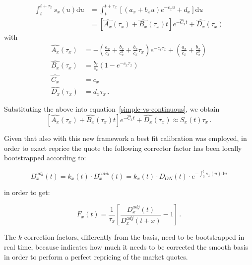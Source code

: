 \begin{equation}
\begin{split}
\int_t^{t+\tau_x} s_x(u) \mathrm{d}u &= \int_t^{t+\tau_x} \left[ (a_x + b_x u)e^{-c_x u} + d_x \right] \mathrm{d}u \\
                                     &= \left[\hat{A_x}(\tau_x) + \hat{B_x}(\tau_x) t\right] e^{-\hat{C}_x  t} + \hat{D_x}(\tau_x)
\end{split}
\end{equation}
with
\begin{equation}
\label{eq:integratedCoef}
\begin{split}
\hat{A_x}(\tau_x)&=-\left(\frac{a_x}{c_x}+ \frac{b_x}{c_x^{2}}+\frac{b_x}{c_x}\tau_x \right)e^{-c_x \tau_x}+\left(\frac{a_x}{c_x}+ \frac{b_x}{c_x^{2}}\right) \\
\hat{B_x}(\tau_x)&=\frac{b_x}{c_x}\left(1-e^{-c_x \tau_x}\right) \\
\hat{C_x}&=c_x \\
\hat{D_x}(\tau_x)&=d_x \tau_x\,.
\end{split}
\end{equation}

Substituting the above into equation~\ref{simple-vs-continuous}, we obtain
\begin{equation}
\left[\hat{A_x}(\tau_x) + \hat{B_x}(\tau_x) t\right] e^{-\hat{C}_x t} + \hat{D_x}(\tau_x) \approx S_x(t) \tau_x \,.
\end{equation}

Given that also with this new framework a best fit calibration was employed, in order to exact reprice the quote the following corrector factor has been locally bootstrapped according to:

\begin{equation}
\label{eq:bootstrapp_correcton_factors}
D_x^{adj}(t) = k_x(t) \cdot D_x^{calib}(t) = k_x(t) \cdot D_{ON}(t) \cdot e^{-\int_0^{t} s_x(u) \mathrm{d}u}
\end{equation}

in order to get:

\begin{equation}
F_x(t) = \frac{1}{\tau_x} \left[\frac{D^{adj}_x(t)}{D^{adj}_x(t+x)} - 1 \right]\,.
\end{equation}

The $k$ correction factors, differently from the basis, need to be bootstrapped in real time, because indicates how much it needs to be corrected the smooth basis in order to perform a perfect repricing of the market quotes.

